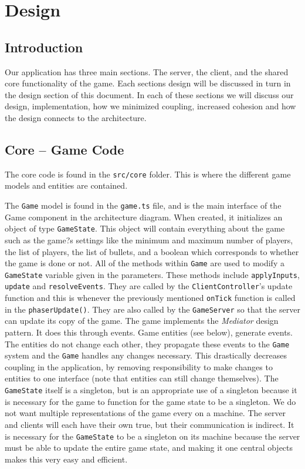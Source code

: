 \documentclass[12pt]{report}
\begin{document}
\chapter{Design}

\section{Introduction}
Our application has three main sections. The server, the client, and the shared core functionality of the game. Each sections design will be discussed in turn in the design section of this document. In each of these sections we will discuss our design, implementation, how we minimized coupling, increased cohesion and how the design connects to the architecture. 
\section{Core -- Game Code}

The core code is found in the \texttt{src/core} folder. This is where the different game models and entities are contained.


The \texttt{Game} model is found in the \texttt{game.ts} file, and is the main interface of the Game component in the architecture diagram. When created, it initializes an object of type \texttt{GameState}. This object will contain everything about the game such as the game?s settings like the minimum and maximum number of players, the list of players, the list of bullets, and a boolean which corresponds to whether the game is done or not. All of the methods within \texttt{Game} are used to modify a \texttt{GameState} variable given in the parameters. These methods include \texttt{applyInputs}, \texttt{update} and \texttt{resolveEvents}. They are called by the \texttt{ClientController}'s update function and this is whenever the previously mentioned \texttt{onTick} function is called in the \texttt{phaserUpdate()}. They are also called by the \texttt{GameServer} so that the server can update its copy of the game. The game implements the \textit{Mediator} design pattern. It does this through events. Game entities (see below), generate events. The entities do not change each other, they propagate these events to the \texttt{Game} system and the \texttt{Game} handles any changes necessary. This drastically decreases coupling in the application, by removing responsibility to make changes to entities to one interface (note that entities can still change themselves). The \texttt{GameState} itself is a singleton, but is an appropriate use of a singleton because it is necessary for the game to function for the game state to be a singleton. We do not want multiple representations of the game every on a machine. The server and clients will each have their own true, but their communication is indirect. It is necessary for the \texttt{GameState} to be a singleton on its machine because the server must be able to update the entire game state, and making it one central objects makes this very easy and efficient. 
\end{document}
